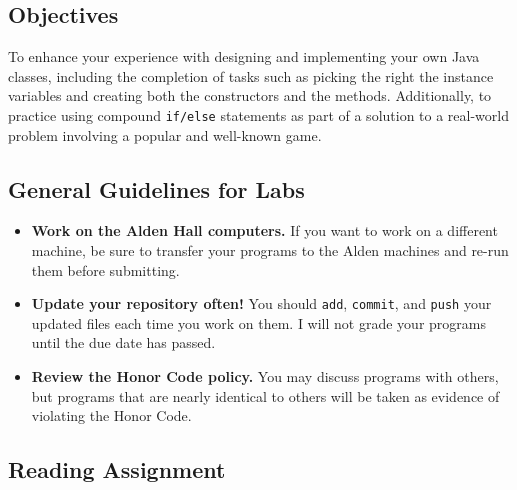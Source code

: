 



\vspace{-0.2in}
\subsection*{Objectives}
\vspace{-0.05in}

To enhance your experience with designing and implementing your own Java classes, including the completion of tasks such
as picking the right the instance variables and creating both the constructors and the methods.  Additionally, to practice
using compound {\tt if/else} statements as part of a solution to a real-world problem involving a popular and well-known
game.

\vspace{-0.15in}
\subsection*{General Guidelines for Labs}
\vspace{-0.05in}
\begin{itemize}
\item
{\bf Work on the Alden Hall computers.} If you want to work on a different
machine, be sure to transfer your programs to the Alden
machines and re-run them before submitting.
\item
  {\bf Update your repository often!} You should {\tt add}, {\tt commit}, 
  and {\tt push} your updated files each time you work on them.  I will not grade 
your programs until the due date has passed.
\item
{\bf Review the Honor Code policy.} You
may discuss programs with others, but programs that are nearly identical
to others will be taken as evidence of violating the Honor Code.
\end{itemize}

\vspace{-0.15in}
\subsection*{Reading Assignment}
\vspace{-0.05in}

